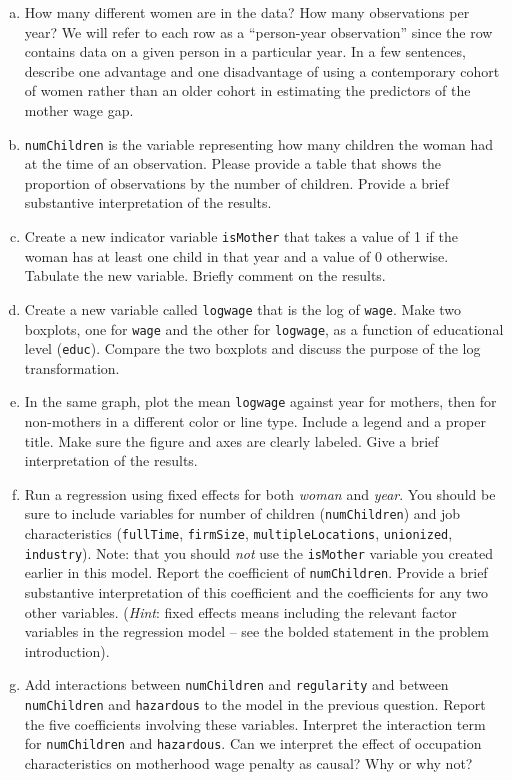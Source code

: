 \documentclass[11pt]{article}
\begin{document}
\begin{enumerate}[a.]
\item How many different women are in the data? How many observations 
  per year? We will refer to each row as a ``person-year observation'' 
  since the row contains data on a given person in a particular year.
  In a few sentences, describe one advantage and one disadvantage of using 
  a contemporary cohort of women rather than an older cohort in 
  estimating the predictors of the mother wage gap.
\item {\tt numChildren} is the variable representing how many children 
  the woman had at the time of an observation. Please provide a table 
  that shows the proportion of observations by the number of children.
  Provide a brief substantive interpretation of the results.
\item Create a new indicator variable {\tt isMother} that takes a value of 1 
  if the woman has at least one child in that year and a value 
  of 0 otherwise. Tabulate the new variable. Briefly comment on 
  the results.
\item Create a new variable called {\tt logwage} that is the log of {\tt wage}. 
  Make two boxplots, one for {\tt wage} and the other for {\tt logwage}, 
  as a function of educational level ({\tt educ}). Compare the two boxplots 
  and discuss the purpose of the log transformation. 
\item In the same graph, plot the mean {\tt logwage} against year for mothers, 
  then for non-mothers in a different color or line type. Include 
  a legend and a proper title. Make sure the figure and axes are 
  clearly labeled. Give a brief interpretation of the results.
\item Run a regression using fixed effects for both {\it woman} and {\it year}. 
You should be sure to include variables for number of children ({\tt numChildren})
and job characteristics ({\tt fullTime}, {\tt firmSize}, {\tt multipleLocations}, 
{\tt unionized}, {\tt industry}). Note: that you should \textit{not} use the {\tt isMother} 
variable you created earlier in this model. Report the coefficient of {\tt numChildren}. 
Provide a brief substantive interpretation of this coefficient and
the coefficients for any two other variables. (\textit{Hint}: fixed effects means including the relevant factor variables in the regression model -- see the bolded statement in the problem introduction).
\item Add interactions between {\tt numChildren} and {\tt regularity} and between 
  {\tt numChildren} and {\tt hazardous} to the model in the previous question. Report the 
  five coefficients involving these variables. Interpret the interaction 
  term for {\tt numChildren} and {\tt hazardous}. Can we interpret 
  the effect of occupation characteristics on motherhood wage penalty 
  as causal? Why or why not?
\end{enumerate}
\end{document}
